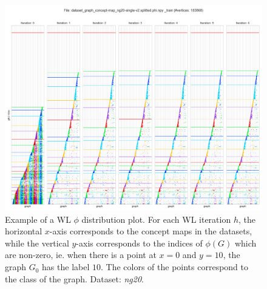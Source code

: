 \begin{figure}[htb!]
	\centering
	{\includegraphics[width=\linewidth]{assets/figures/phi_distribution/ng20_train.png}%
		\caption{%
			Example of a WL $\phi$ distribution plot.
			For each WL iteration $h$, the horizontal $x$-axis corresponds to the concept maps in the datasets, while the vertical $y$-axis corresponds to the indices of $\phi(G)$ which are non-zero, ie. when there is a point at $x=0$ and $y=10$, the graph $G_0$ has the label $10$.
			The colors of the points correspond to the class of the graph.
			Dataset: \textit{ng20}.
		}%
		\label{fig:phi_distribution_example}}
\end{figure}

